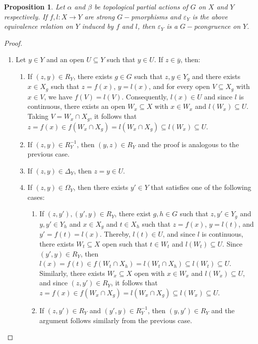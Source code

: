 \documentclass[sn-mathphys-num]{sn-jnl}%
\theoremstyle{thmstyleone}%
\newtheorem{proposition}[theorem]{Proposition}%
\theoremstyle{thmstyletwo}%
\theoremstyle{thmstylethree}%
\begin{document}
\begin{proposition}
Let $ \alpha $ and $ \beta $ be topological partial actions of $ G $ on $ X $ and $ Y $ respectively. If $ f, l: X \to Y $ are strong $G-$pmorphisms and $ \varepsilon_Y$ is the above equivalence relation on $Y$ induced by $f$ and $l$, then $\varepsilon_Y $ is a $ G-$pcongruence on $ Y $.
\end{proposition}
\begin{proof}\hspace{0.5cm}
\begin{enumerate}
    \item Let $y \in Y$ and an open $U \subseteq Y$ such that $y \in U$. If $z \in \overline{y}$, then:
    \begin{enumerate}
        \item If $(z, y) \in R_Y$, there exists $g \in G$ such that $z, y \in Y_g$ and there exists $ x \in X_g $ such that $z = f(x)$, $y = l(x)$, and for every open $V \subseteq X_g$ with $x \in V$, we have $f(V) = l(V)$. Consequently, $l(x) \in U$ and since $l$ is continuous, there exists an open $W_x \subseteq X$ with $x \in W_x$ and $l(W_x) \subseteq U$. Taking $V = W_x \cap X_g$, it follows that $z = f(x) \in f(W_x \cap X_g) = l(W_x \cap X_g) \subseteq l(W_x) \subseteq U$.
        \item If $(z, y) \in R_Y^{-1}$, then $(y, z) \in R_Y$ and the proof is analogous to the previous case.
        \item If $(z, y) \in \Delta_Y$, then $z = y \in U$.
        \item If $(z, y) \in \Omega_Y$, then there exists $y' \in Y$ that satisfies one of the following cases:
        \begin{enumerate}
            \item If $(z, y'), (y', y) \in R_Y$, there exist $g, h \in G$ such that $z, y' \in Y_g$ and $y, y' \in Y_h$ and $x \in X_g$ and $t \in X_h$ such that $z = f(x)$, $y = l(t)$, and $y' = f(t) = l(x)$. Thereby, $l(t) \in U$, and since $l$ is continuous, there exists $W_t \subseteq X$ open such that $t \in W_t$ and $l(W_t) \subseteq U$. Since $(y', y) \in R_Y$, then $l(x) = f(t) \in f(W_t \cap X_h) = l(W_t \cap X_h) \subseteq l(W_t) \subseteq U.$ Similarly, there exists $W_x \subseteq X$ open with $x \in W_x$ and $l(W_x) \subseteq U$, and since $(z, y') \in R_Y$, it follows that $z = f(x) \in f(W_x \cap X_g) = l(W_x \cap X_g) \subseteq l(W_x) \subseteq U.$
            \item If $(z, y') \in R_Y$ and $(y', y) \in R_Y^{-1}$, then $(y, y') \in R_Y$ and the argument follows similarly from the previous case.

\end{enumerate}
\end{enumerate}
\end{enumerate}
\end{proof}
\end{document}

